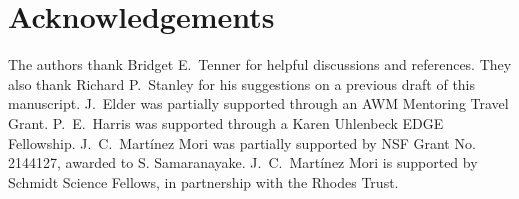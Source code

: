 \documentclass[11pt,reqno]{amsart}
\theoremstyle{definition}
\theoremstyle{notation}
\theoremstyle{openproblem}
\begin{document}
\section*{Acknowledgements}
The authors thank Bridget E.~Tenner for helpful discussions and references. They also thank Richard P.~Stanley for his suggestions on a previous draft of this manuscript.
J.~Elder was partially supported through an AWM Mentoring Travel Grant. P.~E.~Harris was supported through a Karen Uhlenbeck EDGE Fellowship.  
J.~C.~Mart\'inez Mori was partially supported by NSF Grant No. 2144127, awarded to S. Samaranayake. 
J.~C.~Mart\'inez Mori is supported by Schmidt Science Fellows, in partnership with the Rhodes Trust.




\end{document}
